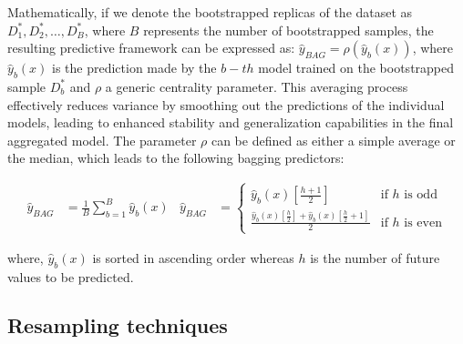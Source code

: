 \documentclass[poms,final,nonblindrev]{poms1_V1} %
\begin{document}
Mathematically, if we denote the bootstrapped replicas of the dataset as $D^*_1, D^*_2, \ldots, D^*_B$, where $B$  represents the number of bootstrapped samples, the resulting predictive framework can be expressed as:  $\hat{y}_{\textit{BAG}} = \rho( \hat{y}_{b}(x) )$, where $\hat{y}_{b}(x)$ is the prediction made by the $b-th$ model trained on the bootstrapped sample $ D^*_b $  and $\rho$ a generic centrality parameter. 
This averaging process effectively reduces variance by smoothing out the predictions of the individual models, leading to enhanced stability and generalization capabilities in the final aggregated model.  The parameter $\rho$ can be defined as either a simple average or the median, which leads to the following bagging predictors:

\begin{align}
	\hat{y}_{\textit{BAG}} &= \frac{1}{B} \sum_{b=1}^{B} \hat{y}_{b}(x) &
	\hat{y}_{\textit{BAG}} &=
	\begin{cases}
		\hat{y}_{b}(x)\left[\frac{h+1}{2}\right] & \text{if } h \text{ is odd} \\
		\frac{\hat{y}_{b}(x)\left[\frac{h}{2}\right] + \hat{y}_{b}(x)\left[\frac{h}{2} + 1\right]}{2} & \text{if } h \text{ is even}
	\end{cases}
\end{align}

\noindent where, $\hat{y}_{b}(x)$  is  sorted in ascending order whereas $h$ is the number of future values to be predicted.

\subsection{Resampling techniques} \label{Subsec:resampling}
\end{document}
